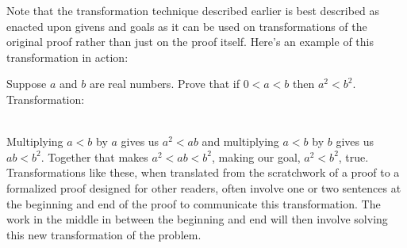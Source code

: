 \documentclass{article}
\begin{document}
\noindent Note that the transformation technique described earlier is best described as enacted upon givens and goals as it can be used on transformations of the original proof rather than just on the proof itself. Here's an example of this transformation in action:

\noindent Suppose $a$ and $b$ are real numbers. Prove that if $0 < a < b$ then $a^2 < b^2$.\\
Transformation:\\
 \\
Multiplying $a < b$ by $a$ gives us $a^2 < ab$ and multiplying $a < b$ by $b$ gives us $ab < b^2$. Together that makes $a^2 < ab < b^2$, making our goal, $a^2 < b^2$, true.\\

\noindent Transformations like these, when translated from the scratchwork of a proof to a formalized proof designed for other readers, often involve one or two sentences at the beginning and end of the proof to communicate this transformation. The work in the middle in between the beginning and end will then involve solving this new transformation of the problem. 
\end{document}
